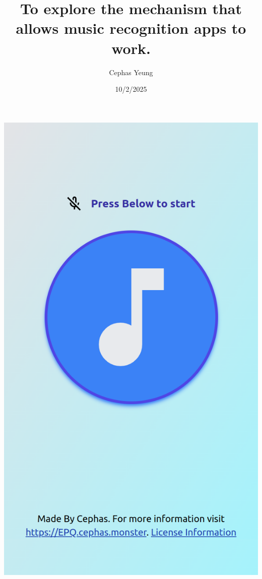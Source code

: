 \documentclass[twoside]{report}
\title{To explore the mechanism that allows music recognition apps to work. }
\author{Cephas Yeung}
\date{10/2/2025}
\begin{document}
\begin{titlepage}
   \centering
   {\Large \bfseries \spacedallcaps{\runtitle} \bigbreak}
   {\scriptsize \small{\runauthor} \bigbreak}
   \includegraphics[scale=0.3]{screenshots/main_screen.png}\par\vspace{1cm}
\end{titlepage}
\tableofcontents
\newpage

\end{document}
